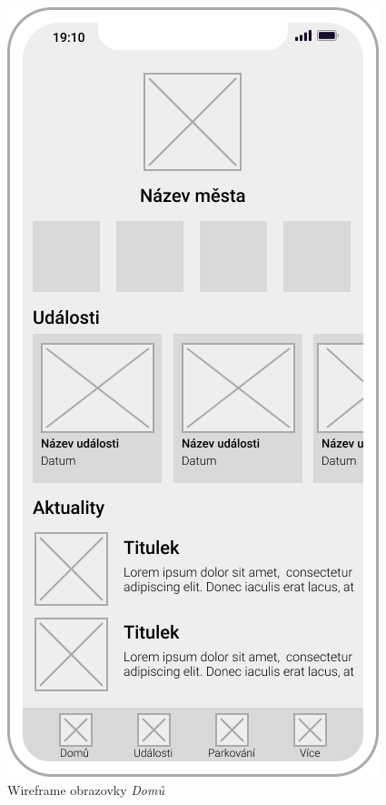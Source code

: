 \hfill
\begin{minipage}[t]{0.45\textwidth}
  \begin{figure}[H]
    \centering
    \includegraphics[width=.7\textwidth]{home_wireframe.png}
    \caption{Wireframe obrazovky \textit{Domů}}
    \label{fig:wireframe1}
  \end{figure}
  \begin{figure}[H]
    \centering

\end{figure}
\end{minipage}
